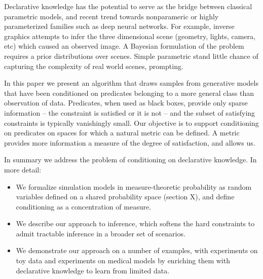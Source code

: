 Declarative knowledge has the potential to serve as the bridge between classical parametric models, and recent trend towards nonparameric or highly parameterized families such as deep neural networks.
For example, inverse graphics attempts to infer the three dimensional scene (geometry, lights, camera, etc) which caused an observed image.
A Bayesian formulation of the problem requires a prior distributions over scenes.
Simple parametric stand little chance of capturing the complexity of real world scenes, prompting.



In this paper we present an algorithm that draws samples from generative models that have been conditioned on predicates belonging to a more general class than observation of data.
Predicates, when used as black boxes, provide only sparse information -- the constraint is satisfied or it is not -- and the subset of satisfying constraints is typically vanishingly small.
Our objective is to support conditioning on predicates on spaces for which a natural metric can be defined.
A metric provides more information a measure of the degree of satisfaction, and allows us.

In summary we address the problem of conditioning on declarative knowledge.
In more detail:
\begin{itemize}
\item We formalize simulation models in measure-theoretic probability as random variables defined on a shared probability space (section X), and define conditioning as a concentration of measure.
\item We describe our approach to inference, which softens the hard constraints to admit tractable inference in a broader set of scenarios.
\item  We demonstrate our approach on a number of examples, with experiments on toy data and experiments on medical models by enriching them with declarative knowledge to learn from limited data.
\end{itemize}